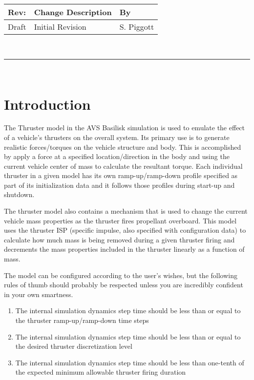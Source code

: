 \documentclass[]{LASPreport}
\begin{document}
\makeCover


%
%
\pagestyle{empty}
{\renewcommand{\arraystretch}{2}
\noindent
\begin{longtable}{|p{0.5in}|p{4.5in}|p{1.14in}|}
\hline
{\bfseries Rev}: & {\bfseries Change Description} & {\bfseries By} \\
\hline
Draft & Initial Revision & S. Piggott \\
\hline

\end{longtable}
}

\newpage
\setcounter{page}{1}
\pagestyle{fancy}

\tableofcontents
~\\ \hrule ~\\


\section{Introduction}
The Thruster model in the AVS Basilisk simulation is used to emulate the effect 
of a vehicle's thrusters on the overall system.  Its primary use is to generate 
realistic forces/torques on the vehicle structure and body.  This is 
accomplished by apply a force at a specified location/direction in the body and 
using the current vehicle center of mass to calculate the resultant torque.  
Each individual thruster in a given model has its own ramp-up/ramp-down profile 
specified as part of its initialization data and it follows those profiles during 
start-up and shutdown.

The thruster model also contains a mechanism that is used to change the current 
vehicle mass properties as the thruster fires propellant overboard.  This model 
uses the thruster ISP (specific impulse, also specified with configuration data) 
to calculate how much mass is being removed during a given thruster firing and 
decrements the mass properties included in the thruster linearly as a function 
of mass.  

The model can be configured according to the user's wishes, but the following 
rules of thumb should probably be respected unless you are incredibly confident 
in your own smartness.
\begin{enumerate}
\item{The internal simulation dynamics step time should be less than or equal 
     to the thruster ramp-up/ramp-down time steps}
\item{The internal simulation dynamics step time should be less than or equal to 
     the desired thruster discretization level}
\item{The internal simulation dynamics step time should be less than one-tenth 
    of the expected minimum allowable thruster firing duration}
\end{enumerate}
\end{document}

